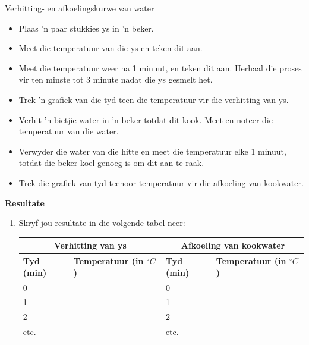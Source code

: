 \begin{f_experiment}{Verhitting- en afkoelingskurwe van water}
{\label{m38736*id9872}\begin{itemize}[noitemsep]
            \item Plaas 'n paar stukkies ys in 'n beker.
\item Meet die temperatuur van die ys en teken dit aan.
\item Meet die temperatuur weer na 1 minuut, en teken dit aan. Herhaal die proses vir ten minste tot 3 minute nadat die ys gesmelt het.
\item Trek 'n grafiek van die tyd teen die temperatuur vir die verhitting van ys. 
\item Verhit 'n bietjie water in 'n beker totdat dit kook. Meet en noteer die temperatuur van die water.
\item Verwyder die water van die hitte en meet die temperatuur elke 1 minuut, totdat die beker koel genoeg is om dit aan te raak.
\item Trek die grafiek van tyd teenoor temperatuur vir die afkoeling van kookwater. 
\end{itemize}
\label{m38736*eip-282}
	\par 
      \label{m38736*eip-863}\noindent{}\textbf{Resultate} \\
\begin{enumerate}[noitemsep, label=\textbf{\arabic*}.]
\item Skryf jou resultate in die volgende tabel neer: \\
          \begin{table}[H]
        \begin{center}
      \label{m38736*uid434}
    \noindent
      \begin{tabular}{|l|l|l|l|}\hline
\multicolumn{2}{|c|}{Verhitting van ys} & \multicolumn{2}{|c|}{Afkoeling van kookwater}  \\ \hline
 \textbf{Tyd (min)} & \textbf{Temperatuur (in $^{\circ} C$)} &  \textbf{Tyd (min)} & \textbf{Temperatuur (in $^{\circ} C$)} \\ \hline
     0    & & 0    & \\ \hline 
     1    & & 1    & \\ \hline
     2    & & 2    & \\ \hline
     etc. & & etc. & \\ \hline

\end{tabular}
\end{center}
\end{table}
\end{enumerate}}
\end{f_experiment}
